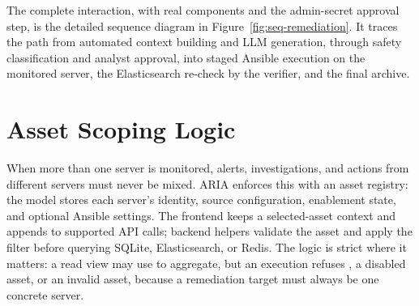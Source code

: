 The complete interaction, with real components and the admin-secret approval step, is the detailed sequence diagram in Figure~\ref{fig:seq-remediation}. It traces the path from automated context building and LLM generation, through safety classification and analyst approval, into staged Ansible execution on the monitored server, the Elasticsearch re-check by the verifier, and the final archive.



\section{Asset Scoping Logic}

When more than one server is monitored, alerts, investigations, and actions from different servers must never be mixed. ARIA enforces this with an asset registry: the  model stores each server's identity, source configuration, enablement state, and optional Ansible settings. The frontend keeps a selected-asset context and appends  to supported API calls; backend helpers validate the asset and apply the filter before querying SQLite, Elasticsearch, or Redis. The logic is strict where it matters: a read view may use  to aggregate, but an execution refuses , a disabled asset, or an invalid asset, because a remediation target must always be one concrete server.

